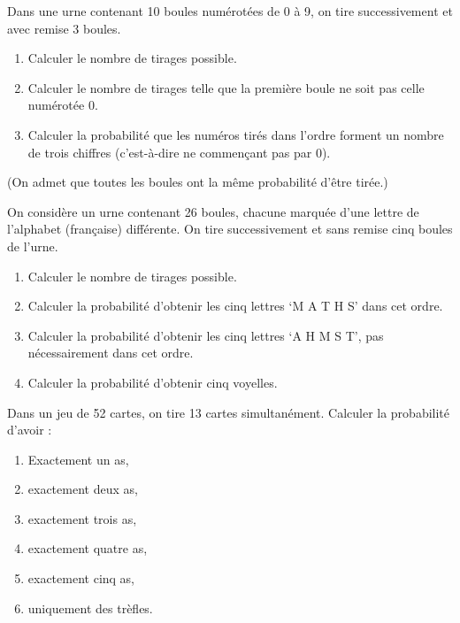             \begin{exe}
                        Dans une urne contenant 10 boules num\'erot\'ees de 0 \`a 9,
                        on tire successivement et avec remise 3 boules.
                        \begin{enumerate}
                              \item Calculer le nombre de tirages possible.
                              \item Calculer le nombre de tirages telle que 
                                    la premi\`ere boule ne soit pas celle num\'erot\'ee 0.
                              \item Calculer la probabilit\'e que les num\'eros tir\'es dans l'ordre
                                    forment un nombre de trois chiffres
                                    (c'est-\`a-dire ne commen\c{c}ant pas par 0).
                        \end{enumerate}
                        (On admet que toutes les boules ont la m\^eme probabilit\'e d'\^etre tir\'ee.)
            \end{exe}
            \begin{exe}
                        On consid\`ere un urne contenant 26 boules,
                        chacune marqu\'ee d'une lettre de l'alphabet (fran\c{c}aise) diff\'erente.
                        On tire successivement et sans remise cinq boules de l'urne.
                        \begin{enumerate}
                              \item Calculer le nombre de tirages possible.
                              \item Calculer la probabilit\'e d'obtenir les cinq lettres `M A T H S' dans cet ordre.
                              \item Calculer la probabilit\'e d'obtenir les cinq lettres `A H M S T',
                                    pas n\'ecessairement dans cet ordre.
                              \item Calculer la probabilit\'e d'obtenir cinq voyelles.
                        \end{enumerate}
            \end{exe}
            \begin{exe}
                        Dans un jeu de 52 cartes, on tire 13 cartes simultan\'ement.
                        Calculer la probabilit\'e d'avoir : 
                        \begin{enumerate}
                              \item Exactement un as,
                              \item exactement deux as,
                              \item exactement trois as,
                              \item exactement quatre as,
                              \item exactement cinq as,
                              \item uniquement des tr\`efles.
                        \end{enumerate}
            \end{exe}
